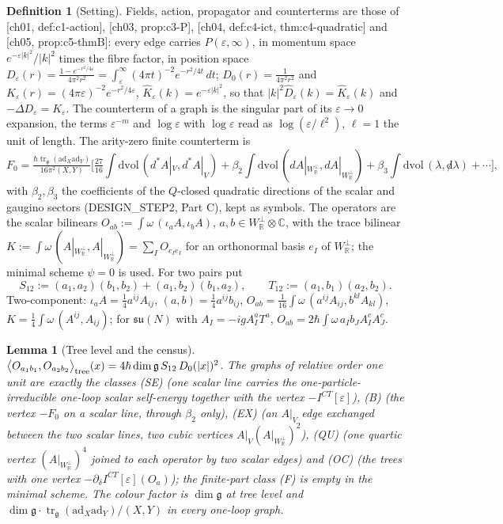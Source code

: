 \documentclass[11pt]{article}
\theoremstyle{plain}
\newtheorem{lemma}[theorem]{Lemma}
\theoremstyle{definition}
\newtheorem{definition}[theorem]{Definition}
\numberwithin{equation}{section}
\newcommand{\unit}{\tfrac{\hbar\operatorname{tr}_{\mathfrak g}(\mathrm{ad}_X\mathrm{ad}_Y)}{16\pi^2(X,Y)}}
\newcommand{\Wp}{W_{\mathbb R}^\perp}
\newcommand{\TPz}[2]{\big\langle #1,#2\big\rangle_{\rm tree}}
\begin{document}
\begin{definition}[Setting]
\label{def:setting}
Fields, action, propagator and counterterms are those of [ch01, def:c1-action], [ch03, prop:c3-P], [ch04, def:c4-ict, thm:c4-quadratic] and [ch05, prop:c5-thmB]: every edge carries $P(\varepsilon,\infty)$, in momentum space $e^{-\varepsilon|k|^2}/|k|^2$ times the fibre factor, in position space $D_\varepsilon(r)=\frac{1-e^{-r^2/4\varepsilon}}{4\pi^2r^2}=\int_\varepsilon^\infty(4\pi t)^{-2}e^{-r^2/4t}\,dt$; $D_0(r)=\frac1{4\pi^2r^2}$ and $K_\varepsilon(r)=(4\pi\varepsilon)^{-2}e^{-r^2/4\varepsilon}$, $\hat K_\varepsilon(k)=e^{-\varepsilon|k|^2}$, so that $|k|^2\hat D_\varepsilon(k)=\hat K_\varepsilon(k)$ and $-\Delta D_\varepsilon=K_\varepsilon$. The counterterm of a graph is the singular part of its $\varepsilon\to0$ expansion, the terms $\varepsilon^{-m}$ and $\log\varepsilon$ with $\log\varepsilon$ read as $\log(\varepsilon/\ell^2)$, $\ell=1$ the unit of length. The arity-zero finite counterterm is
\[
F_0=\unit\Big[\tfrac{27}{16}\int\mathrm{dvol}\,(d^*A|_V,d^*A|_V)+\beta_2\int\mathrm{dvol}\,(dA|_{\Wp},dA|_{\Wp})+\beta_3\int\mathrm{dvol}\,(\lambda,{\not d}\lambda)+\cdots\Big],
\]
with $\beta_2,\beta_3$ the coefficients of the $Q$-closed quadratic directions of the scalar and gaugino sectors (DESIGN\_STEP2, Part C), kept as symbols. The operators are the scalar bilinears $O_{ab}:=\int\omega\,(\iota_aA,\iota_bA)$, $a,b\in\Wp\otimes\mathbb C$, with the trace bilinear $K:=\int\omega\,(A|_{\Wp},A|_{\Wp})=\sum_IO_{e_Ie_I}$ for an orthonormal basis $e_I$ of $\Wp$; the minimal scheme $\psi=0$ is used. For two pairs put
\[
S_{12}:=(a_1,a_2)(b_1,b_2)+(a_1,b_2)(b_1,a_2),\qquad T_{12}:=(a_1,b_1)(a_2,b_2).
\]
Two-component: $\iota_aA=\tfrac14a^{ij}A_{ij}$, $(a,b)=\tfrac14a^{ij}b_{ij}$, $O_{ab}=\tfrac1{16}\int\omega\,(a^{ij}A_{ij},b^{kl}A_{kl})$, $K=\tfrac14\int\omega\,(A^{ij},A_{ij})$; for $\mathfrak{su}(N)$ with $A_I=-igA^a_IT^a$, $O_{ab}=2\hbar\int\omega\,a_Ib_JA^c_IA^c_J$.
\end{definition}

\begin{lemma}[Tree level and the census]
\label{lem:census}
$\TPz{O_{a_1b_1}}{O_{a_2b_2}}(x)=4\hbar\dim\mathfrak g\,S_{12}\,D_0(|x|)^2$. The graphs of relative order one unit are exactly the classes (SE) (one scalar line carries the one-particle-irreducible one-loop scalar self-energy together with the vertex $-I^{CT}[\varepsilon]$), (B) (the vertex $-F_0$ on a scalar line, through $\beta_2$ only), (EX) (an $A|_V$ edge exchanged between the two scalar lines, two cubic vertices $A|_V(A|_{\Wp})^2$), (QU) (one quartic vertex $(A|_{\Wp})^4$ joined to each operator by two scalar edges) and (OC) (the trees with one vertex $-\partial_\delta I^{CT}[\varepsilon](O_a)$); the finite-part class (F) is empty in the minimal scheme. The colour factor is $\dim\mathfrak g$ at tree level and $\dim\mathfrak g\cdot\operatorname{tr}_{\mathfrak g}(\mathrm{ad}_X\mathrm{ad}_Y)/(X,Y)$ in every one-loop graph.
\end{lemma}
\end{document}
